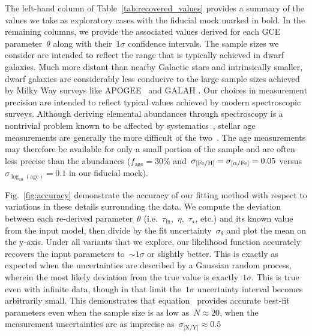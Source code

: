\documentclass[ms.tex]{subfiles}
\begin{document}
The left-hand column of Table~\ref{tab:recovered_values} provides a summary of
the values we take as exploratory cases with the fiducial mock marked in bold.
In the remaining columns, we provide the associated values derived for each
GCE parameter~$\theta$ along with their~$1\sigma$ confidence intervals.
The sample sizes we consider are intended to reflect the range that is
typically achieved in dwarf galaxies.
Much more distant than nearby Galactic stars and intrinsically smaller, dwarf
galaxies are considerably less conducive to the large sample sizes achieved by
Milky Way surveys like APOGEE~\citep{Majewski2017} and GALAH
\citep{DeSilva2015, Martell2017}.
Our choices in measurement precision are intended to reflect typical values
achieved by modern spectroscopic surveys.
Although deriving elemental abundances through spectroscopy is a nontrivial
problem known to be affected by systematics~\citep[e.g.][]{Anguino2018},
stellar age measurements
are generally the more difficult of the two~\citep{Soderblom2010, Chaplin2013}.
The age measurements may therefore be available for only a small portion of the
sample and are often less precise than the abundances ($f_\text{age} = 30$\%
and~$\sigma_{\text{[Fe/H]}} = \sigma_{\text{[$\alpha$/Fe]}} = 0.05$ versus
$\sigma_{\log_{10}(\text{age})} = 0.1$ in our fiducial mock).
\par
Fig.~\ref{fig:accuracy} demonstrate the accuracy of our fitting method with
respect to variations in these details surrounding the data.
We compute the deviation between each re-derived parameter~$\theta$
(i.e.~$\tau_\text{in}$,~$\eta$,~$\tau_\star$, etc.) and its known value from
the input model, then divide by the fit uncertainty~$\sigma_\theta$ and plot
the mean on the y-axis.
Under all variants that we explore, our likelihood function accurately recovers
the input parameters to~$\sim1\sigma$ or slightly better.
This is exactly as expected when the uncertainties are described by a
Gaussian random process, wherein the most likely deviation from the true value
is exactly~$1\sigma$.
This is true even with infinite data, though in that limit the~$1\sigma$
uncertainty interval becomes arbitrarily small.
This demonstrates that equation~ provides accurate best-fit
parameters even when the sample size is as low as~$N \approx 20$, when the
measurement uncertainties are as imprecise as~$\sigma_\text{[X/Y]} \approx 0.5$
\end{document}

